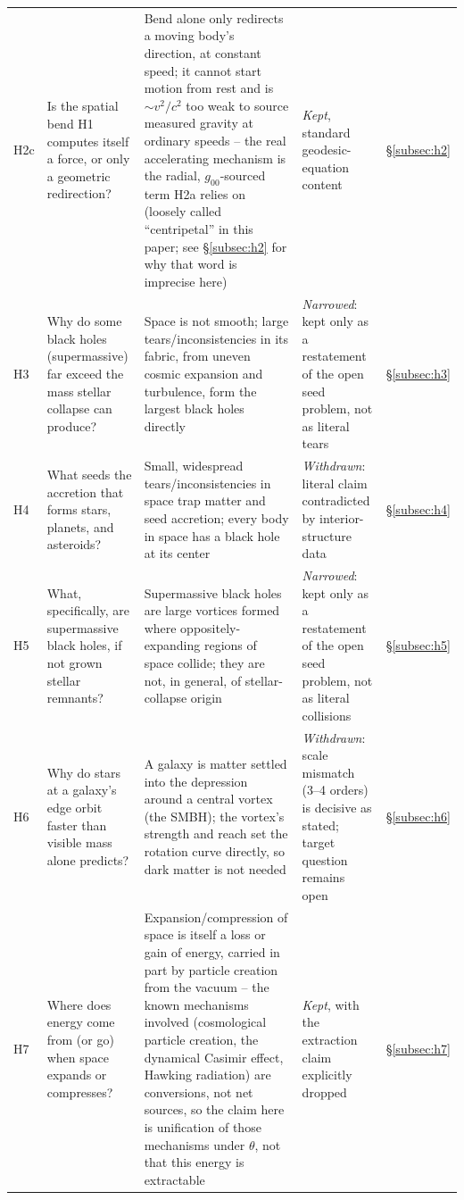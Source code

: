 \documentclass[12pt, a4paper]{article}
\begin{document}
\begin{longtable}{@{}>{\raggedright\arraybackslash}p{1.3cm}>{\raggedright\arraybackslash}p{3.3cm}>{\raggedright\arraybackslash}p{4.0cm}>{\raggedright\arraybackslash}p{2.3cm}>{\raggedright\arraybackslash}p{1.3cm}@{}}
H2c & Is the spatial bend H1 computes itself a force, or only a geometric redirection? & Bend alone only redirects a moving body's direction, at constant speed; it cannot start motion from rest and is $\sim v^2/c^2$ too weak to source measured gravity at ordinary speeds -- the real accelerating mechanism is the radial, $g_{00}$-sourced term H2a relies on (loosely called ``centripetal'' in this paper; see \S\ref{subsec:h2} for why that word is imprecise here) & \emph{Kept}, standard geodesic-equation content & \S\ref{subsec:h2} \\
H3 & Why do some black holes (supermassive) far exceed the mass stellar collapse can produce? & Space is not smooth; large tears/inconsistencies in its fabric, from uneven cosmic expansion and turbulence, form the largest black holes directly & \emph{Narrowed}: kept only as a restatement of the open seed problem, not as literal tears & \S\ref{subsec:h3} \\
H4 & What seeds the accretion that forms stars, planets, and asteroids? & Small, widespread tears/inconsistencies in space trap matter and seed accretion; every body in space has a black hole at its center & \emph{Withdrawn}: literal claim contradicted by interior-structure data & \S\ref{subsec:h4} \\
H5 & What, specifically, are supermassive black holes, if not grown stellar remnants? & Supermassive black holes are large vortices formed where oppositely-expanding regions of space collide; they are not, in general, of stellar-collapse origin & \emph{Narrowed}: kept only as a restatement of the open seed problem, not as literal collisions & \S\ref{subsec:h5} \\
H6 & Why do stars at a galaxy's edge orbit faster than visible mass alone predicts? & A galaxy is matter settled into the depression around a central vortex (the SMBH); the vortex's strength and reach set the rotation curve directly, so dark matter is not needed & \emph{Withdrawn}: scale mismatch (3--4 orders) is decisive as stated; target question remains open & \S\ref{subsec:h6} \\
H7 & Where does energy come from (or go) when space expands or compresses? & Expansion/compression of space is itself a loss or gain of energy, carried in part by particle creation from the vacuum -- the known mechanisms involved (cosmological particle creation, the dynamical Casimir effect, Hawking radiation) are conversions, not net sources, so the claim here is unification of those mechanisms under $\theta$, not that this energy is extractable & \emph{Kept}, with the extraction claim explicitly dropped & \S\ref{subsec:h7} \\

\end{longtable}
\end{document}
